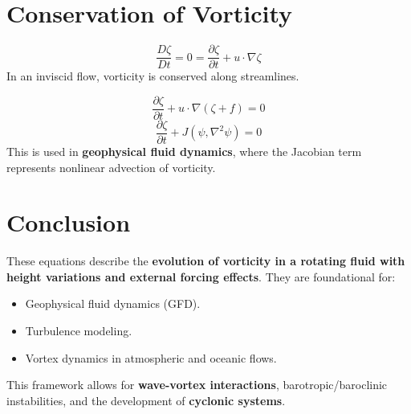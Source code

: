     \section{Conservation of Vorticity}
    \begin{equation}
        \frac{D \zeta}{D t}=0=\frac{\partial \zeta}{\partial t}+u \cdot \nabla \zeta
    \end{equation}
    In an inviscid flow, vorticity is conserved along streamlines.

    \begin{equation}
        \frac{\partial \zeta}{\partial t} + u \cdot \nabla(\zeta + f)=0
    \end{equation}
    \begin{equation}
        \frac{\partial \zeta}{\partial t}+J(\psi, \nabla^2 \psi)=0
    \end{equation}
    This is used in \textbf{geophysical fluid dynamics}, where the Jacobian term represents nonlinear advection of vorticity.

    \section{Conclusion}
    These equations describe the \textbf{evolution of vorticity in a rotating fluid with height variations and external forcing effects}. They are foundational for:
    \begin{itemize}
        \item Geophysical fluid dynamics (GFD).
        \item Turbulence modeling.
        \item Vortex dynamics in atmospheric and oceanic flows.
    \end{itemize}
    This framework allows for \textbf{wave-vortex interactions}, barotropic/baroclinic instabilities, and the development of \textbf{cyclonic systems}.

